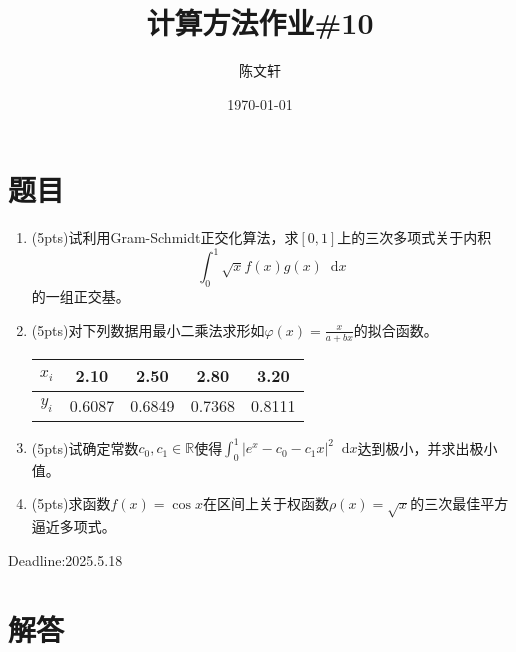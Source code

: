\documentclass[cn,hazy,green,11pt,normal]{elegantnote}
\title{计算方法作业\#10}
\author{陈文轩}
\institute{KFRC}
\date{\today}
\newcommand*{\diff}{\mathop{}\!\mathrm{d}}
\begin{document}
\maketitle

\section{题目}


\begin{enumerate}

    \item (5pts)试利用Gram-Schmidt正交化算法，求$[0,1]$上的三次多项式关于内积\[\int_0^1\sqrt{x}f(x)g(x)\diff x\]的一组正交基。

    \item (5pts)对下列数据用最小二乘法求形如$\varphi(x)=\frac{x}{a+bx}$的拟合函数。

        \begin{table}[H]
            \centering
            \begin{tabular}{|c|c|c|c|c|}
                \hline
                $x_i$ & 2.10 & 2.50 & 2.80 & 3.20 \\
                \hline
                $y_i$ & 0.6087 & 0.6849 & 0.7368 & 0.8111 \\
                \hline
            \end{tabular}
            \label{tab:1}
        \end{table}

    \item (5pts)试确定常数$c_0,c_1\in\mathbb{R}$使得$\int_0^1| e^x-c_0-c_1 x|^2\diff x$达到极小，并求出极小值。

    \item (5pts)求函数$f(x)=\cos x$在区间上关于权函数$\rho(x)=\sqrt{x}$的三次最佳平方逼近多项式。
\end{enumerate}

    Deadline:2025.5.18

\section{解答}
\end{document}
